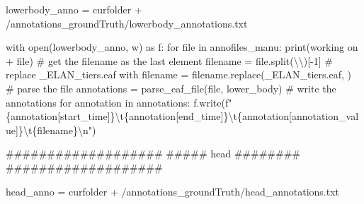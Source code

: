 \documentclass[
  letterpaper,
  DIV=11,
  numbers=noendperiod]{scrreprt}
\newenvironment{Shaded}{\begin{snugshade}}{\end{snugshade}}
\newcommand{\BuiltInTok}[1]{\textcolor[rgb]{0.00,0.23,0.31}{#1}}
\newcommand{\CharTok}[1]{\textcolor[rgb]{0.13,0.47,0.30}{#1}}
\newcommand{\CommentTok}[1]{\textcolor[rgb]{0.37,0.37,0.37}{#1}}
\newcommand{\ControlFlowTok}[1]{\textcolor[rgb]{0.00,0.23,0.31}{#1}}
\newcommand{\DecValTok}[1]{\textcolor[rgb]{0.68,0.00,0.00}{#1}}
\newcommand{\ImportTok}[1]{\textcolor[rgb]{0.00,0.46,0.62}{#1}}
\newcommand{\KeywordTok}[1]{\textcolor[rgb]{0.00,0.23,0.31}{#1}}
\newcommand{\NormalTok}[1]{\textcolor[rgb]{0.00,0.23,0.31}{#1}}
\newcommand{\OperatorTok}[1]{\textcolor[rgb]{0.37,0.37,0.37}{#1}}
\newcommand{\SpecialCharTok}[1]{\textcolor[rgb]{0.37,0.37,0.37}{#1}}
\newcommand{\SpecialStringTok}[1]{\textcolor[rgb]{0.13,0.47,0.30}{#1}}
\newcommand{\StringTok}[1]{\textcolor[rgb]{0.13,0.47,0.30}{#1}}
\begin{document}
\begin{Shaded}
\begin{Highlighting}[]
\NormalTok{lowerbody\_anno }\OperatorTok{=}\NormalTok{ curfolder }\OperatorTok{+} \StringTok{\textquotesingle{}/annotations\_groundTruth/lowerbody\_annotations.txt\textquotesingle{}}

\ControlFlowTok{with} \BuiltInTok{open}\NormalTok{(lowerbody\_anno, }\StringTok{\textquotesingle{}w\textquotesingle{}}\NormalTok{) }\ImportTok{as}\NormalTok{ f:}
    \ControlFlowTok{for} \BuiltInTok{file} \KeywordTok{in}\NormalTok{ annofiles\_manu:}
        \BuiltInTok{print}\NormalTok{(}\StringTok{\textquotesingle{}working on \textquotesingle{}} \OperatorTok{+} \BuiltInTok{file}\NormalTok{)}
        \CommentTok{\# get the filename as the last element}
\NormalTok{        filename }\OperatorTok{=} \BuiltInTok{file}\NormalTok{.split(}\StringTok{\textquotesingle{}}\CharTok{\textbackslash{}\textbackslash{}}\StringTok{\textquotesingle{}}\NormalTok{)[}\OperatorTok{{-}}\DecValTok{1}\NormalTok{]}
        \CommentTok{\# replace \_ELAN\_tiers.eaf with \textquotesingle{}\textquotesingle{}}
\NormalTok{        filename }\OperatorTok{=}\NormalTok{ filename.replace(}\StringTok{\textquotesingle{}\_ELAN\_tiers.eaf\textquotesingle{}}\NormalTok{, }\StringTok{\textquotesingle{}\textquotesingle{}}\NormalTok{)}
        \CommentTok{\# parse the file}
\NormalTok{        annotations }\OperatorTok{=}\NormalTok{ parse\_eaf\_file(}\BuiltInTok{file}\NormalTok{, }\StringTok{\textquotesingle{}lower\_body\textquotesingle{}}\NormalTok{)}
        \CommentTok{\# write the annotations}
        \ControlFlowTok{for}\NormalTok{ annotation }\KeywordTok{in}\NormalTok{ annotations:}
\NormalTok{            f.write(}\SpecialStringTok{f"}\SpecialCharTok{\{}\NormalTok{annotation[}\StringTok{\textquotesingle{}start\_time\textquotesingle{}}\NormalTok{]}\SpecialCharTok{\}}\CharTok{\textbackslash{}t}\SpecialCharTok{\{}\NormalTok{annotation[}\StringTok{\textquotesingle{}end\_time\textquotesingle{}}\NormalTok{]}\SpecialCharTok{\}}\CharTok{\textbackslash{}t}\SpecialCharTok{\{}\NormalTok{annotation[}\StringTok{\textquotesingle{}annotation\_value\textquotesingle{}}\NormalTok{]}\SpecialCharTok{\}}\CharTok{\textbackslash{}t}\SpecialCharTok{\{}\NormalTok{filename}\SpecialCharTok{\}}\CharTok{\textbackslash{}n}\SpecialStringTok{"}\NormalTok{)}

\CommentTok{\#\#\#\#\#\#\#\#\#\#\#\#\#\#\#\#\#\#\#}
\CommentTok{\#\#\#\#\# head \#\#\#\#\#\#\#\#}
\CommentTok{\#\#\#\#\#\#\#\#\#\#\#\#\#\#\#\#\#\#\#}

\NormalTok{head\_anno }\OperatorTok{=}\NormalTok{ curfolder }\OperatorTok{+} \StringTok{\textquotesingle{}/annotations\_groundTruth/head\_annotations.txt\textquotesingle{}}


\end{Highlighting}
\end{Shaded}
\end{document}
